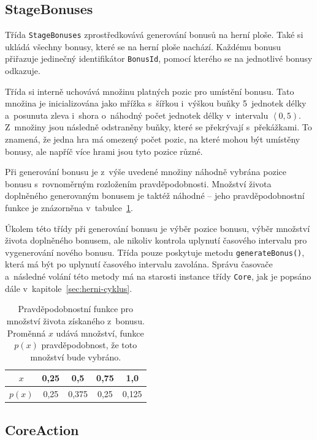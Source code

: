 \subsection*{StageBonuses}

Třída \texttt{StageBonuses} zprostředkovává generování bonusů na herní ploše. Také si ukládá všechny bonusy, které se na herní ploše nachází. Každému bonusu přiřazuje jedinečný identifikátor \texttt{BonusId}, pomocí kterého se na jednotlivé bonusy odkazuje.

Třída si interně uchovává množinu platných pozic pro umístění bonusu. Tato množina je inicializována jako mřížka s~šířkou i~výškou buňky 5~jednotek délky a~posunuta zleva i~shora o~náhodný počet jednotek délky v~intervalu $\left<0,5\right)$. Z~množiny jsou následně odstraněny buňky, které se překrývají s~překážkami. To znamená, že jedna hra má omezený počet pozic, na které mohou být umístěny bonusy, ale napříč více hrami jsou tyto pozice různé.

Při generování bonusu je z~výše uvedené množiny náhodně vybrána pozice bonusu s~rovnoměrným rozložením pravděpodobnosti. Množství života doplněného generovaným bonusem je taktéž náhodné -- jeho pravděpodobnostní funkce je znázorněna v~tabulce~\ref{tab:hp-recovery-prob}.

Úkolem této třídy při generování bonusu je výběr pozice bonusu, výběr množství života doplněného bonusem, ale nikoliv kontrola uplynutí časového intervalu pro vygenerování nového bonusu. Třída pouze poskytuje metodu \texttt{generateBonus()}, která má být po uplynutí časového intervalu zavolána. Správu časovače a~následné volání této metody má na starosti instance třídy \texttt{Core}, jak je popsáno dále v~kapitole~\ref{sec:herni-cyklus}.

\begin{table}[ht]
    \centering
    \begin{tabular}{|c|c|c|c|c|} \hline
        $x$    & 0{,}25 & 0{,}5   & 0{,}75 & 1{,}0   \\ \hline
        $p(x)$ & 0{,}25 & 0{,}375 & 0{,}25 & 0{,}125 \\ \hline
    \end{tabular}
    \caption{Pravděpodobnostní funkce pro množství života získaného z~bonusu. Proměnná $x$ udává množství, funkce $p(x)$ pravděpodobnost, že toto množství bude vybráno.}
    \label{tab:hp-recovery-prob}
\end{table}

\subsection*{CoreAction}

